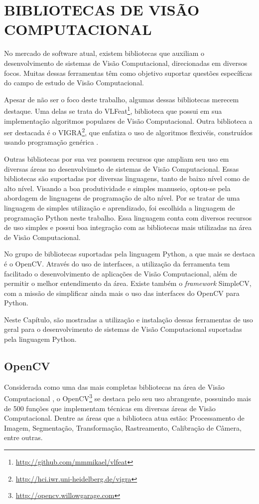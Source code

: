 \chapter{BIBLIOTECAS DE VISÃO COMPUTACIONAL}

No mercado de software atual, existem bibliotecas que auxiliam o desenvolvimento de sistemas de Visão Computacional, direcionadas em diversos focos. Muitas dessas ferramentas têm como objetivo suportar questões específicas do campo de estudo de Visão Computacional.

Apesar de não ser o foco deste trabalho, algumas dessas bibliotecas merecem destaque. Uma delas se trata do VLFeat\footnote{\url{http://github.com/mmmikael/vlfeat}}, biblioteca que possui em sua implementação algoritmos populares de Visão Computacional. Outra biblioteca a ser destacada é o VIGRA\footnote{\url{http://hci.iwr.uni-heidelberg.de/vigra}}, que enfatiza o uso de algoritmos flexivéis, construídos usando programação genérica \cite{MUSSER}.

Outras bibliotecas por sua vez possuem recursos que ampliam seu uso em diversas áreas no desenvolvimeto de sistemas de Visão Computacional. Essas bibliotecas são suportadas por diversas linguagens, tanto de baixo nível como de alto nível. Visando a boa produtividade e simples manuseio, optou-se pela abordagem de linguagens de programação de alto nível. Por se tratar de uma linguagem de simples utilização e aprendizado, foi escolhida a linguagem de programação Python neste trabalho. Essa linguagem conta com diversos recursos de uso simples e possui boa integração com as bibliotecas mais utilizadas na área de Visão Computacional.

No grupo de bibliotecas suportadas pela linguagem Python, a que mais se destaca é o OpenCV. Através do uso de interfaces, a utilização da ferramenta tem facilitado o desenvolvimento de aplicações de Visão Computacional, além de permitir o melhor entendimento da área. Existe também o \textit{framework} SimpleCV, com a missão de simplificar ainda mais o uso das interfaces do OpenCV para Python.

Neste Capítulo, são mostradas a utilização e instalação dessas ferramentas de uso geral para o desenvolvimento de sistemas de Visão Computacional suportadas pela linguagem Python.

\section{OpenCV}

Considerada como uma das mais completas bibliotecas na área de Visão Computacional \cite{THORNE} \cite{SEYDOUX}, o OpenCV\footnote{\url{http://opencv.willowgarage.com}} se destaca pelo seu uso abrangente, possuindo mais de 500 funções que implementam técnicas em diversas áreas de Visão Computacional. Dentre as áreas que a biblioteca atua estão: Processamento de Imagem, Segmentação, Transformação, Rastreamento, Calibração de Câmera, entre outras.


